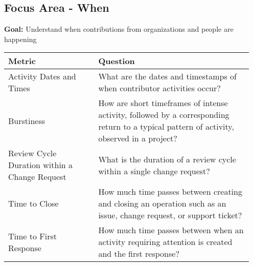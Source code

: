
\subsection{Focus Area - When}
\textbf{Goal:} Understand when contributions from organizations and people are happening
\begin{table}[ht!]
    \centering
    \begin{tabular}{|p{0.35\linewidth} | p{0.6\linewidth}|}
        \hline
        \hfil \textbf{Metric}  & \hfil \textbf{Question} \\
        \hline
		Activity Dates and Times & What are the dates and timestamps of when contributor activities occur? \\ 
		\hline
		Burstiness & How are short timeframes of intense activity, followed by a corresponding return to a typical pattern of activity, observed in a project? \\ 
		\hline
		Review Cycle Duration within a Change Request & What is the duration of a review cycle within a single change request? \\ 
		\hline
		Time to Close & How much time passes between creating and closing an operation such as an issue, change request, or support ticket? \\ 
		\hline
		Time to First Response & How much time passes between when an activity requiring attention is created and the first response? \\ 
		\hline
    \end{tabular}
\end{table}

 
 
 
 
 
